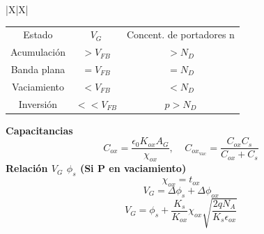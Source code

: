 \documentclass[../main.tex]{subfiles}
\begin{document}
\begin{xltabular}{\textwidth}{|X|X|}
  \\
  \begin{center}
    \begin{tabular}{|c|c|c|}
      \firsthline
      \multicolumn{3}{| c |}{\textbf{Para sustrato N}}
      \\
      \hline
      Estado      & $V_G$       & Concent. de portadores n \\
      \hline
      Acumulación & $> V_{FB}$  & $>N_D$                   \\
      Banda plana & $= V_{FB}$  & $=N_D$                   \\
      Vaciamiento & $< V_{FB}$  & $< N_D$                  \\
      Inversión   & $<< V_{FB}$ & $p > N_D$                \\
      \hline
    \end{tabular}\newline\newline\end{center}
  \textbf{Capacitancias}
  $$C_{ox} = \frac{\epsilon_0K_{ox}A_G}{\chi_{ox}}, ~~~~~ C_{ox_{\text{vac}}} =  \frac{C_{ox} C_s}{C_{ox} + C_s}$$
  \textbf{Relación $V_G$ $\phi_s$ (Si P en vaciamiento)}
  $$\chi_{ox} = t_{ox}$$
  $$V_G = \Delta\phi_s + \Delta\phi_{ox}$$
  $$V_G = \phi_s + \frac{K_s}{K_{ox}}\chi_{ox}\sqrt{\frac{2qN_A}{K_s\epsilon_{ox}}}$$


\end{xltabular}
\end{document}
